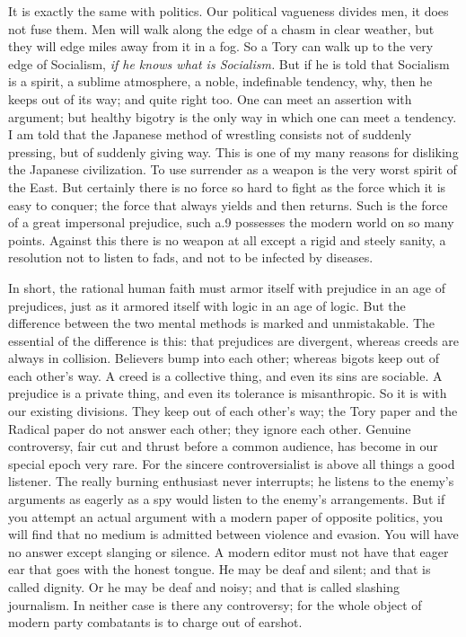 \documentclass{book}
\begin{document}
It is exactly the same with politics. Our political vagueness divides men, it does not fuse them. Men will walk along the edge of a chasm in clear weather, but they will edge miles away from it in a fog. So a Tory can walk up to the very edge of Socialism, \emph{if he knows what is Socialism.} But if he is told that Socialism is a spirit, a sublime atmosphere, a noble, indefinable tendency, why, then he keeps out of its way; and quite right too. One can meet an assertion with argument; but healthy bigotry is the only way in which one can meet a tendency. I am told that the Japanese method of wrestling consists not of suddenly pressing, but of suddenly giving way. This is one of my many reasons for disliking the Japanese civilization. To use surrender as a weapon is the very worst spirit of the East. But certainly there is no force so hard to fight as the force which it is easy to conquer; the force that always yields and then returns. Such is the force of a great impersonal prejudice, such a.9 possesses the modern world on so many points. Against this there is no weapon at all except a rigid and steely sanity, a resolution not to listen to fads, and not to be infected by diseases.

In short, the rational human faith must armor itself with prejudice in an age of prejudices, just as it armored itself with logic in an age of logic. But the difference between the two mental methods is marked and unmistakable. The essential of the difference is this: that prejudices are divergent, whereas creeds are always in collision. Believers bump into each other; whereas bigots keep out of each other’s way. A creed is a collective thing, and even its sins are sociable. A prejudice is a private thing, and even its tolerance is misanthropic. So it is with our existing divisions. They keep out of each other’s way; the Tory paper and the Radical paper do not answer each other; they ignore each other. Genuine controversy, fair cut and thrust before a common audience, has become in our special epoch very rare. For the sincere controversialist is above all things a good listener. The really burning enthusiast never interrupts; he listens to the enemy’s arguments as eagerly as a spy would listen to the enemy’s arrangements. But if you attempt an actual argument with a modern paper of opposite politics, you will find that no medium is admitted between violence and evasion. You will have no answer except slanging or silence. A modern editor must not have that eager ear that goes with the honest tongue. He may be deaf and silent; and that is called dignity. Or he may be deaf and noisy; and that is called slashing journalism. In neither case is there any controversy; for the whole object of modern party combatants is to charge out of earshot.
\end{document}
